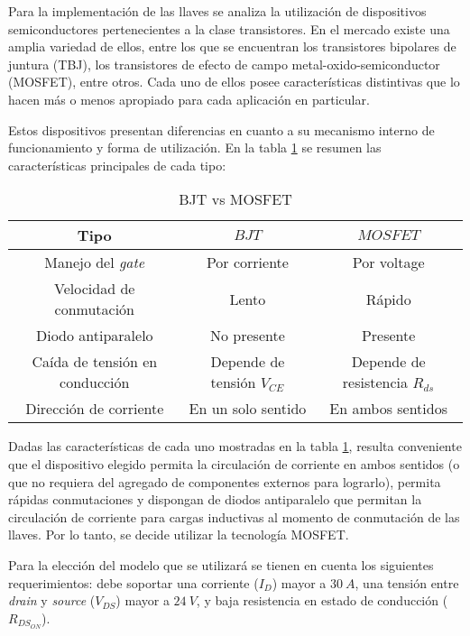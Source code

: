 Para la implementación de las llaves se analiza la utilización de dispositivos semiconductores pertenecientes a la clase transistores. En el mercado existe una amplia variedad de ellos, entre los que se encuentran los transistores bipolares de juntura (TBJ), los transistores de efecto de campo metal-oxido-semiconductor (MOSFET), entre otros. Cada uno de ellos posee características distintivas que lo hacen más o menos apropiado para cada aplicación en particular. 

Estos dispositivos presentan diferencias en cuanto a su mecanismo interno de funcionamiento y forma de utilización. En la tabla \ref{tab_MOSFETvsBJT} se resumen las características principales de cada tipo:

\begin{table}[H]
	\begin{center}
		\begin{tabular}{| c | c | c |}
			\hline
			Tipo & $BJT$ & $MOSFET$\\ \hline
			Manejo del \textsl{gate} & Por corriente & Por voltage \\ \hline 
			Velocidad de conmutación & Lento & Rápido \\ \hline 
			Diodo antiparalelo & No presente & Presente \\ \hline 
			Caída de tensión en conducción & Depende de tensión  $V_{CE}$ & Depende de resistencia $R_{ds}$ \\ \hline 
			Dirección de corriente & En un solo sentido & En ambos sentidos \\ \hline 
		\end{tabular}
		\caption{BJT vs MOSFET}
		\label{tab_MOSFETvsBJT}
	\end{center}
\end{table}

Dadas las características de cada uno mostradas en la tabla \ref{tab_MOSFETvsBJT}, resulta conveniente que el dispositivo elegido permita la circulación de corriente en ambos sentidos (o que no requiera del agregado de componentes externos para lograrlo), permita rápidas conmutaciones y dispongan de diodos antiparalelo que permitan la circulación de corriente para cargas inductivas al momento de conmutación de las llaves. Por lo tanto, se decide utilizar la tecnología MOSFET.

Para la elección del modelo que se utilizará se tienen en cuenta los siguientes requerimientos: debe soportar una corriente ($I_{D}$) mayor a $30\:A$, una tensión entre \textsl{drain} y \textsl{source} ($V_{DS}$) mayor a $24\:V$, y baja resistencia en estado de conducción ($R_{DS_{ON}}$).


